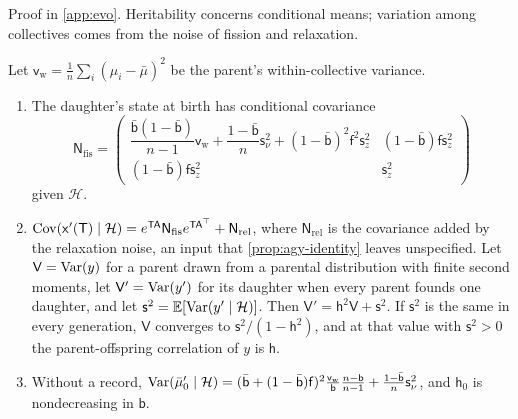 Proof in \cref{app:evo}. Heritability concerns conditional means; variation among collectives comes from the noise of fission and relaxation.

\begin{proposition}\label{prop:evo-variance}
Let $\mathsf v_{\mathrm w}=\frac1n\sum_i(\mu_i-\bar\mu)^2$ be the parent's within-collective variance.
\begin{enumerate}
\item[(a)] The daughter's state at birth has conditional covariance
\begin{equation}\label{eq:evo-noise}
\mathsf N_{\mathrm{fis}}=\begin{pmatrix}\dfrac{\bar{\mathsf b}(1-\bar{\mathsf b})}{n-1}\mathsf v_{\mathrm w}+\dfrac{1-\bar{\mathsf b}}{n}\mathsf s_\nu^2+(1-\bar{\mathsf b})^2\mathsf f^2\mathsf s_z^2&(1-\bar{\mathsf b})\mathsf f\mathsf s_z^2\\[1.5ex](1-\bar{\mathsf b})\mathsf f\mathsf s_z^2&\mathsf s_z^2\end{pmatrix}
\end{equation}
given $\mathcal H$.
\item[(b)] $\operatorname{Cov}(\mathsf x'(\mathsf T)\mid\mathcal H)=e^{\mathsf T\mathsf A}\mathsf N_{\mathrm{fis}}e^{\mathsf T\mathsf A^\top}+\mathsf N_{\mathrm{rel}}$, where $\mathsf N_{\mathrm{rel}}$ is the covariance added by the relaxation noise, an input that \cref{prop:agy-identity} leaves unspecified. Let $\mathsf V=\operatorname{Var}(y)$ for a parent drawn from a parental distribution with finite second moments, let $\mathsf V'=\operatorname{Var}(y')$ for its daughter when every parent founds one daughter, and let $\mathsf s^2=\mathbb{E}[\operatorname{Var}(y'\mid\mathcal H)]$. Then $\mathsf V'=\mathsf h^2\mathsf V+\mathsf s^2$. If $\mathsf s^2$ is the same in every generation, $\mathsf V$ converges to $\mathsf s^2/(1-\mathsf h^2)$, and at that value with $\mathsf s^2>0$ the parent-offspring correlation of $y$ is $\mathsf h$.
\item[(c)] Without a record, $\operatorname{Var}(\bar\mu'_0\mid\mathcal H)=(\bar{\mathsf b}+(1-\bar{\mathsf b})\mathsf f)^2\frac{\mathsf v_{\mathrm w}}{\mathsf b}\frac{n-\mathsf b}{n-1}+\frac{1-\bar{\mathsf b}}{n}\mathsf s_\nu^2$, and $\mathsf h_0$ is nondecreasing in $\mathsf b$.
\end{enumerate}
\end{proposition}

